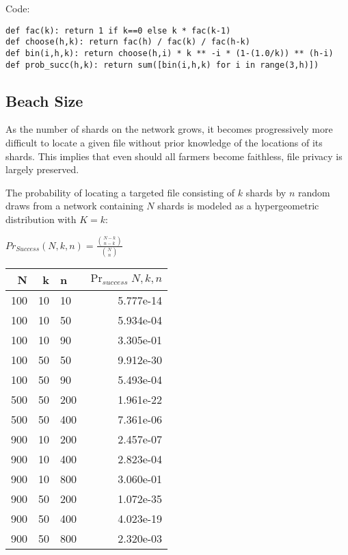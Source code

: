 \documentclass[a4paper,10pt]{article}
\begin{document}
Code:
\begin{lstlisting}
def fac(k): return 1 if k==0 else k * fac(k-1)
def choose(h,k): return fac(h) / fac(k) / fac(h-k)
def bin(i,h,k): return choose(h,i) * k ** -i * (1-(1.0/k)) ** (h-i)
def prob_succ(h,k): return sum([bin(i,h,k) for i in range(3,h)])
\end{lstlisting}

\subsection{Beach Size}
As the number of shards on the network grows, it becomes progressively more difficult to locate a given file without prior knowledge of the locations of its shards. This implies that even should all farmers become faithless, file privacy is largely preserved.

The probability of locating a targeted file consisting of $ k $ shards by $ n $ random draws from a network containing $ N $ shards is modeled as a hypergeometric distribution with $ K = k $:

{\centering
$Pr_{Success}(N,k,n) = \displaystyle \frac{{N-k \choose n-k}}{{N \choose n}}$
\\}

\begin{table}[hbt!]
\begin{center}
\begin{tabular}{r r l r}
N & k & n & $\Pr_{success}{N,k,n}$\\
\hline 100 & 10 & 10  & 5.777e-14\\
\hline 100 & 10 & 50  & 5.934e-04\\
\hline 100 & 10 & 90  & 3.305e-01\\
\hline 100 & 50 & 50  & 9.912e-30\\
\hline 100 & 50 & 90  & 5.493e-04\\
\hline 500 & 50 & 200 & 1.961e-22\\
\hline 500 & 50 & 400 & 7.361e-06\\
\hline 900 & 10 & 200 & 2.457e-07\\
\hline 900 & 10 & 400 & 2.823e-04\\
\hline 900 & 10 & 800 & 3.060e-01\\
\hline 900 & 50 & 200 & 1.072e-35\\
\hline 900 & 50 & 400 & 4.023e-19\\
\hline 900 & 50 & 800 & 2.320e-03\\
\end{tabular}
\end{center}
\end{table}
\end{document}

